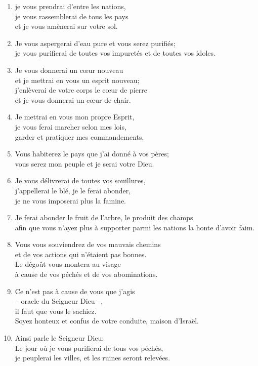 \begin{enumerate}[leftmargin=\psleftmargin, labelsep = \pslabelsep, label={\arabic*}, font=\color{\pscolor}\small\textsuperscript, parsep=0em, itemsep=0em, topsep=0em ]
    \item je vous prendrai d’entre les nations, \\ je vous rassemblerai de tous les pays \\ et je vous amènerai sur votre sol.
    \item Je vous aspergerai d’eau pure et vous serez purifiés; \\ je vous purifierai de toutes vos impuretés et de toutes vos idoles.
    \item Je vous donnerai un cœur nouveau \\ et je mettrai en vous un esprit nouveau; \\ j’enlèverai de votre corps le cœur de pierre \\ et je vous donnerai un cœur de chair.
    \item Je mettrai en vous mon propre Esprit, \\ je vous ferai marcher selon mes lois, \\ garder et pratiquer mes commandements.
    \item Vous habiterez le pays que j’ai donné à vos pères; \\ vous serez mon peuple et je serai votre Dieu.
    \item Je vous délivrerai de toutes vos souillures, \\ j’appellerai le blé, je le ferai abonder, \\ je ne vous imposerai plus la famine.
    \item Je ferai abonder le fruit de l’arbre, le produit des champs \\ afin que vous n’ayez plus à supporter parmi les nations la honte d’avoir faim.
    \item Vous vous souviendrez de vos mauvais chemins \\ et de vos actions qui n’étaient pas bonnes. \\ Le dégoût vous montera au visage \\ à cause de vos péchés et de vos abominations.
    \item Ce n’est pas à cause de vous que j’agis \\ – oracle du Seigneur Dieu –, \\ il faut que vous le sachiez. \\ Soyez honteux et confus de votre conduite, maison d’Israël. \parSpace
    \item Ainsi parle le Seigneur Dieu: \\ Le jour où je vous purifierai de tous vos péchés, \\ je peuplerai les villes, et les ruines seront relevées.

\end{enumerate}
